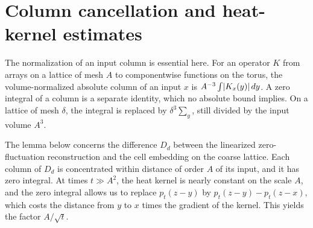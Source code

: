 \section{Column cancellation and heat-kernel estimates}\label{ch14:sec:signed}

The normalization of an input column is essential here. For an operator $K$ from arrays on a lattice of mesh $A$ to componentwise functions on the torus, the volume-normalized absolute column of an input $x$ is $A^{-3}\int\lvert K_x(y)\rvert\,dy$. A zero integral of a column is a separate identity, which no absolute bound implies. On a lattice of mesh $\delta$, the integral is replaced by $\delta^3\sum_y$, still divided by the input volume $A^3$.

The lemma below concerns the difference $D_d$ between the linearized zero-fluctuation reconstruction and the cell embedding on the coarse lattice. Each column of $D_d$ is concentrated within distance of order $A$ of its input, and it has zero integral. At times $t\gg A^2$, the heat kernel is nearly constant on the scale $A$, and the zero integral allows us to replace $p_t(z-y)$ by $p_t(z-y)-p_t(z-x)$, which costs the distance from $y$ to $x$ times the gradient of the kernel. This yields the factor $A/\sqrt t$.

